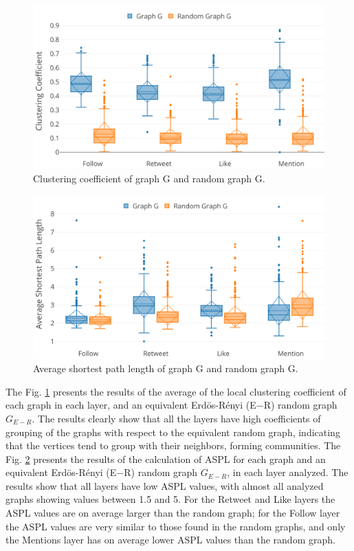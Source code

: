\begin{figure}[h!tb]
    \centering
    \includegraphics[width=1\textwidth]{fig/net_struct/coef_clust_rnd_g.png}
    \caption{Clustering coefficient of graph G and random graph G.}
    \label{fig:net_struct_coef_clust_rnd_g}
\end{figure}

\begin{figure}[h!tb]
    \centering
    \includegraphics[width=1\textwidth]{fig/net_struct/aspl_rnd_g.png}
    \caption{Average shortest path length of graph G and random graph G.}
    \label{fig:net_struct_aspl_rnd_g}
\end{figure}


The Fig. \ref{fig:net_struct_coef_clust_rnd_g} presents the results of the average of the local clustering coefficient of each graph in each layer, and an equivalent Erd\"{o}s-R\'{e}nyi (E$-$R) random graph $G_{E-R}$. The results clearly show that all the layers have high coefficients of grouping of the graphs with respect to the equivalent random graph, indicating that the vertices tend to group with their neighbors, forming communities. The  Fig. \ref{fig:net_struct_aspl_rnd_g} presents the results of the calculation of ASPL for each graph and an equivalent Erd\"{o}s-R\'{e}nyi (E$-$R) random graph $G_{E-R}$, in each layer analyzed. The results show that all layers have low ASPL values, with almost all analyzed graphs showing values between 1.5 and 5. For the Retweet and Like layers the ASPL values are on average larger than the random graph; for the Follow layer the ASPL values are very similar to those found in the random graphs, and only the Mentions layer has on average lower ASPL values than the random graph.

